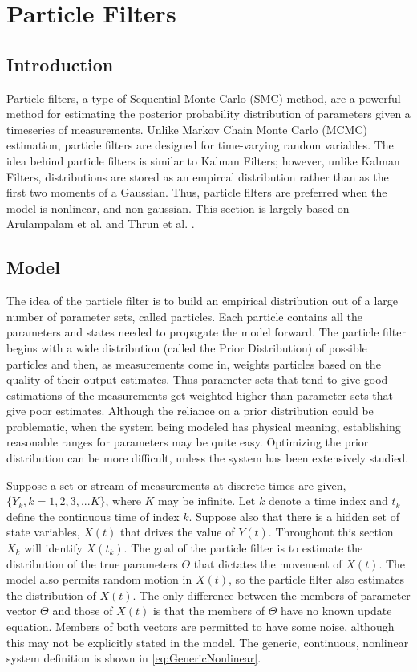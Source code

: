 \chapter{Particle Filters}
\label{sec:Particle Filter}
\section{Introduction}
Particle filters, a type of Sequential Monte Carlo (SMC) method,
are a powerful method for estimating the posterior probability distribution
 of parameters given a timeseries of measurements. Unlike Markov 
Chain Monte Carlo (MCMC) estimation, particle filters are designed for 
time-varying random variables. The idea behind particle filters is
similar to Kalman Filters; however, unlike Kalman Filters,
distributions are stored as an empircal distribution rather than 
as the first two moments of a Gaussian. Thus, particle filters are 
preferred when the model is nonlinear, and non-gaussian. This section
is largely based on Arulampalam et al. and Thrun et al. \cite{Arulampalam2002a, Thrun2005}.

\section{Model}
\label{sec:Particle Filter Model}
The idea of the particle filter is to build an empirical distribution
out of a large number of parameter sets, called particles. Each
particle contains all the parameters and states needed to propagate
the model forward.  The particle filter begins with a wide distribution 
(called the Prior Distribution)
of possible particles and then, as measurements come in, weights 
particles based on the quality of their output estimates. Thus parameter sets 
that tend to give good estimations of the measurements get weighted higher
than parameter sets that give poor estimates. Although the reliance on
a prior distribution could be problematic, when the system being modeled
has physical meaning, establishing reasonable ranges for parameters may be 
quite easy. Optimizing the prior distribution can be more difficult,
unless the system has been extensively studied.

Suppose a set or stream of measurements at discrete times are given, 
$\{Y_k, k = 1, 2, 3, ... K\}$, where $K$ may be infinite. 
Let $k$ denote a time index and $t_k$ define the continuous
time of index $k$.
Suppose also that there is a hidden set of state variables,
$X(t)$ that drives the value of $Y(t)$. Throughout this section
$X_k$ will identify $X(t_k)$. The goal of the particle filter is to estimate the 
distribution of the
true parameters $\Theta$ that dictates the movement of $X(t)$.
The model also permits random motion in $X(t)$, so the 
particle filter also estimates the distribution of $X(t)$.
The only difference between the members of parameter vector
$\Theta$ and those of $X(t)$ is that the members of
$\Theta$ have no known update equation. Members of both vectors
are permitted to have some noise, although this
may not be explicitly stated in the model. The generic, continuous, nonlinear
system definition is shown in \autoref{eq:GenericNonlinear}.

